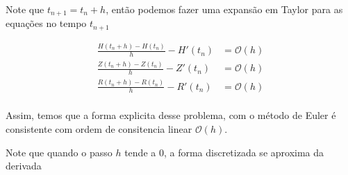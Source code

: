 \documentclass[xcolor=dvipsnames, aspectratio=169]{beamer}
\begin{document}
    \begin{frame}
        Note que $t_{n+1} = t_n + h$, então podemos fazer uma expansão em Taylor para as equações no tempo $t_{n+1}$
    \end{frame}
    \begin{frame}
        \begin{align*}
            \frac{H(t_n + h) - H(t_n)}{h} - H'(t_n) &=  \mathcal{O}(h)\\
            \frac{Z(t_n + h) - Z(t_n)}{h} - Z'(t_n) &= \mathcal{O}(h)\\
            \frac{R(t_n + h) - R(t_n)}{h} - R'(t_n) &=  \mathcal{O}(h)\\
        \end{align*}
        
        Assim, temos que a forma explicita desse problema, com o método de Euler é consistente com ordem de consitencia linear $\mathcal O (h)$.
        
        Note que quando o passo $h$ tende a 0, a forma discretizada se aproxima da derivada
    \end{frame}
\end{document}

